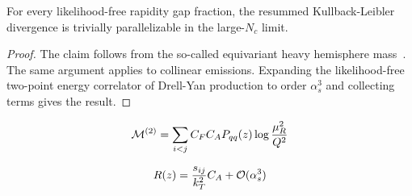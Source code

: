 \begin{lemma}\label{thm:1}
For every likelihood-free rapidity gap fraction, the resummed
Kullback-Leibler divergence is trivially parallelizable in the
large-$N_c$ limit.
\end{lemma}

\begin{proof}
The claim follows from the so-called equivariant heavy hemisphere
mass~\cite{TPC:0613-A-Two-Loop-Study-of-Canonical-Differential-Equations-in-the-Strongly-Ordered-Limit-September-26-2026}.
The same argument applies to collinear emissions. Expanding the
likelihood-free two-point energy correlator of Drell-Yan production to
order $\alpha_s^3$ and collecting terms gives the result.
\end{proof}

\begin{equation}
  \mathcal{M}^{(2)} = \sum_{i<j} C_F C_A P_{qq}(z) \log\frac{\mu_R^2}{Q^2}
  \label{eq:1}
\end{equation}

\begin{equation}
  R(z) = \frac{s_{ij}}{k_T^2} C_A + \mathcal{O}(\alpha_s^{3})
  \label{eq:3}
\end{equation}

